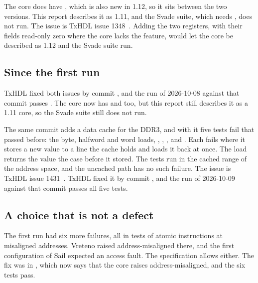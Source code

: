 The core does have , which is also new in 1.12, so it
sits between the two versions. This report describes it as 1.11, and
the Svade suite, which needs , does not run. The issue
is TxHDL issue 1348~\cite{issue1348}. Adding the two registers, with
their fields read-only zero where the core lacks the feature, would
let the core be described as 1.12 and the Svade suite run.

\subsection{Since the first run}

TxHDL fixed both issues by commit , and the run of
2026-10-08 against that commit passes
. The core now has
 and  too, but this report still
describes it as a 1.11 core, so the Svade suite still does not run.

The same commit adds a data cache for the DDR3, and with it five tests
fail that passed before: the byte, halfword and word loads,
, , ,  and
. Each fails where it stores a new value to a line the
cache holds and loads it back at once. The load returns the value the
case before it stored. The tests run in the cached range of the
address space, and the uncached path has no such failure. The issue is
TxHDL issue 1431~\cite{issue1431}. TxHDL fixed it by commit
, and the run of 2026-10-09 against that commit
passes all five tests.

\subsection{A choice that is not a defect}

The first run had six more failures, all in tests of atomic
instructions at misaligned addresses. Vreteno raised
address-misaligned there, and the first configuration of Sail expected
an access fault. The specification allows either. The fix was in
, which now says that the core raises address-misaligned,
and the six tests pass.
